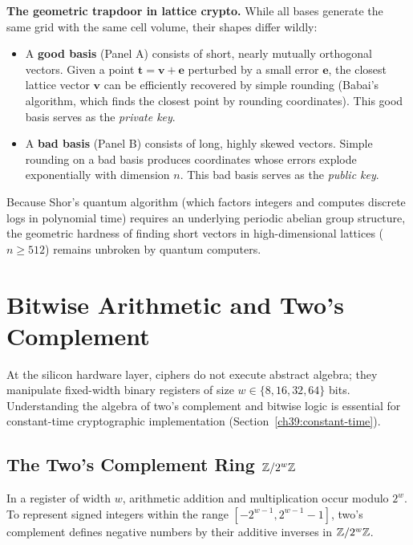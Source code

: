 \begin{focusbox}
\textbf{The geometric trapdoor in lattice crypto.} While all bases generate the same grid
with the same cell volume, their shapes differ wildly:
\begin{itemize}
  \item A \textbf{good basis} (Panel A) consists of short, nearly mutually orthogonal vectors.
  Given a point $\mathbf{t} = \mathbf{v} + \mathbf{e}$ perturbed by a small error $\mathbf{e}$,
  the closest lattice vector $\mathbf{v}$ can be efficiently recovered by simple rounding
  (Babai's algorithm, which finds the closest point by rounding coordinates). This good basis serves as the \emph{private key}.
  \item A \textbf{bad basis} (Panel B) consists of long, highly skewed vectors. Simple rounding
  on a bad basis produces coordinates whose errors explode exponentially with dimension $n$.
  This bad basis serves as the \emph{public key}.
\end{itemize}
Because Shor's quantum algorithm (which factors integers and computes discrete logs in polynomial time) requires an underlying periodic abelian group structure,
the geometric hardness of finding short vectors in high-dimensional lattices ($n \ge 512$)
remains unbroken by quantum computers.
\end{focusbox}

\section{Bitwise Arithmetic and Two's Complement}
\label{ch41:bitwise}

At the silicon hardware layer, ciphers do not execute abstract algebra; they manipulate
fixed-width binary registers of size $w \in \{8, 16, 32, 64\}$ bits. Understanding the
algebra of two's complement and bitwise logic is essential for constant-time cryptographic
implementation (Section~\ref{ch39:constant-time}).

\subsection{The Two's Complement Ring $\mathbb{Z}/2^w\mathbb{Z}$}
\label{ch41:twos-comp-def}

In a register of width $w$, arithmetic addition and multiplication occur modulo $2^w$.
To represent signed integers within the range $[-2^{w-1}, 2^{w-1}-1]$, two's complement
defines negative numbers by their additive inverses in $\mathbb{Z}/2^w\mathbb{Z}$.

